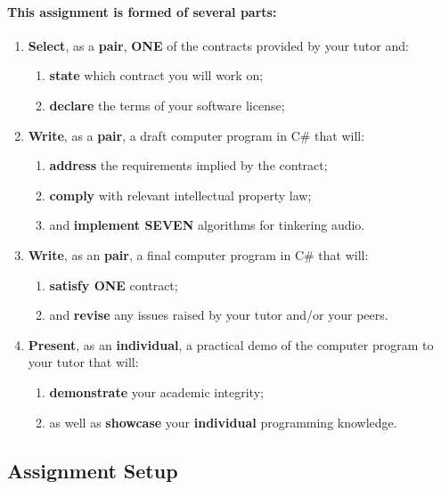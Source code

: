 \documentclass{../../fal_assignment}
\begin{document}
\paragraph{This assignment is formed of several parts:}

\begin{enumerate}[label=(\Alph*)]
    \item \textbf{Select}, as a \textbf{pair}, \textbf{ONE} of the contracts provided by your tutor and:
    	\begin{enumerate}[label=\roman*.]
    		\item \textbf{state} which contract you will work on;
     		\item \textbf{declare} the terms of your software license;
	\end{enumerate}
    \item \textbf{Write}, as a \textbf{pair}, a draft computer program in C\# that will:
    	\begin{enumerate}[label=\roman*.]
    		\item \textbf{address} the requirements implied by the contract;
    		\item \textbf{comply} with relevant intellectual property law;
    		\item and \textbf{implement SEVEN} algorithms for tinkering audio.
	\end{enumerate}
    \item \textbf{Write}, as an \textbf{pair}, a final computer program in C\# that will:
    	\begin{enumerate}[label=\roman*.]
    		\item \textbf{satisfy ONE} contract;
    		\item and \textbf{revise} any issues raised by your tutor and/or your peers.
	\end{enumerate}
    \item \textbf{Present}, as an \textbf{individual}, a practical demo of the computer program to your tutor that will:
    	\begin{enumerate}[label=\roman*.]
    		\item \textbf{demonstrate} your academic integrity;
    		\item as well as \textbf{showcase} your \textbf{individual} programming knowledge.
	\end{enumerate}
\end{enumerate}

\subsection*{Assignment Setup}
\end{document}

